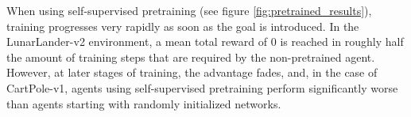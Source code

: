 When using self-supervised pretraining (see figure \ref{fig:pretrained_results}), training progresses very rapidly as soon as the goal is introduced. In the LunarLander-v2 environment, a mean total reward of $0$ is reached in roughly half the amount of training steps that are required by the non-pretrained agent. However, at later stages of training, the advantage fades, and, in the case of CartPole-v1, agents using self-supervised pretraining perform significantly worse than agents starting with randomly initialized networks.
